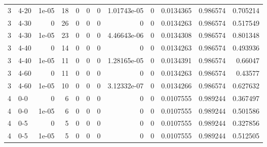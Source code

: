 \begin{tabular}{rlrrrrrrrrrr}
     3 & 4-20   &      1e-05 &          18 &                 0 &                 0 &     0           &     1.01743e-05 &      0           &        0.0134365 &               0.986574 &           0.705214 \\
     3 & 4-30   &      0     &          26 &                 0 &                 0 &     0           &     0           &      0           &        0.0134263 &               0.986574 &           0.517549 \\
     3 & 4-30   &      1e-05 &          23 &                 0 &                 0 &     0           &     4.46643e-06 &      0           &        0.0134308 &               0.986574 &           0.801348 \\
     3 & 4-40   &      0     &          14 &                 0 &                 0 &     0           &     0           &      0           &        0.0134263 &               0.986574 &           0.493936 \\
     3 & 4-40   &      1e-05 &          11 &                 0 &                 0 &     0           &     1.28165e-05 &      0           &        0.0134391 &               0.986574 &           0.66047  \\
     3 & 4-60   &      0     &          11 &                 0 &                 0 &     0           &     0           &      0           &        0.0134263 &               0.986574 &           0.43577  \\
     3 & 4-60   &      1e-05 &          10 &                 0 &                 0 &     0           &     3.12332e-07 &      0           &        0.0134266 &               0.986574 &           0.627632 \\
     4 & 0-0    &      0     &           6 &                 0 &                 0 &     0           &     0           &      0           &        0.0107555 &               0.989244 &           0.367497 \\
     4 & 0-0    &      1e-05 &           6 &                 0 &                 0 &     0           &     0           &      0           &        0.0107555 &               0.989244 &           0.501586 \\
     4 & 0-5    &      0     &           5 &                 0 &                 0 &     0           &     0           &      0           &        0.0107555 &               0.989244 &           0.327856 \\
     4 & 0-5    &      1e-05 &           5 &                 0 &                 0 &     0           &     0           &      0           &        0.0107555 &               0.989244 &           0.512505 \\

\end{tabular}
